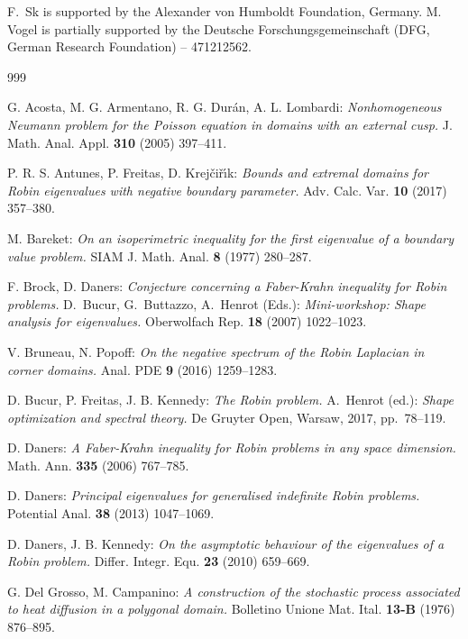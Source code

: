 \documentclass[11pt,oneside,reqno,a4paper]{amsart}
\theoremstyle{definition}
\begin{document}
F.~Sk is supported by the Alexander von Humboldt Foundation, Germany. M. Vogel is partially supported by the Deutsche
Forschungsgemeinschaft (DFG, German Research Foundation) – 471212562.

	
	\begin{thebibliography}{999}
		
		\normalsize
		
		\setlength\itemsep{3pt}
				
		 G. Acosta, M. G. Armentano, R. G. Dur\'an, A. L. Lombardi:
		\emph{Nonhomogeneous Neumann problem for the Poisson equation in domains with an external cusp.}
		J. Math. Anal. Appl. {\bf 310} (2005) 397--411.
		
		 P. R. S. Antunes, P. Freitas, D. Krej\v{c}i\v{r}\'{\i}k: \emph{Bounds and extremal domains for Robin eigenvalues with negative boundary parameter.} Adv. Calc. Var. {\bf  10} (2017) 357--380.
		
		 M. Bareket: \emph{On an isoperimetric inequality for the first eigenvalue of a boundary value problem.} SIAM J. Math. Anal. {\bf 8} (1977) 280--287.
		
F. Brock, D. Daners: \emph{Conjecture concerning a Faber-Krahn inequality for Robin problems.} 
D.~Bucur, G.~Buttazzo, A.~Henrot (Eds.): \emph{Mini-workshop: Shape analysis for eigenvalues.} 
Oberwolfach Rep. {\bf 18} (2007) 1022--1023.

		 V. Bruneau, N. Popoff: \emph{On the negative spectrum of the Robin Laplacian in corner domains.} Anal. PDE {\bf 9} (2016) 1259--1283.
		
		
		D. Bucur, P. Freitas, J. B. Kennedy: \emph{The Robin problem.} A.~Henrot (ed.): \emph{Shape optimization and spectral theory.} De Gruyter Open, Warsaw, 2017, pp.~78--119.
		
		 D. Daners: \emph{A Faber-Krahn inequality for Robin problems in any space dimension.}  Math. Ann. {\bf 335} (2006) 767--785.
		
		 D. Daners: \emph{Principal eigenvalues for generalised indefinite Robin problems.} Potential Anal. {\bf 38} (2013) 1047--1069.
		
		 D. Daners, J. B. Kennedy: \emph{On the asymptotic behaviour of the eigenvalues of a Robin problem.} Differ. Integr. Equ. {\bf 23} (2010) 659--669.
		
		 G. Del Grosso, M. Campanino: \emph{A
			construction of the stochastic process associated to heat diffusion in a
			polygonal domain.} Bolletino Unione Mat. Ital. {\bf 13-B} (1976)
		876--895. 


\end{thebibliography}
\end{document}
